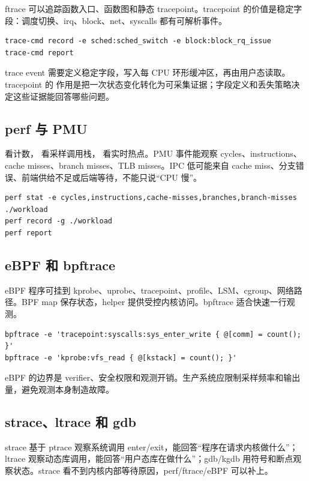 ftrace 可以追踪函数入口、函数图和静态 tracepoint。tracepoint 的价值是稳定字段：调度切换、irq、block、net、syscalls 都有可解析事件。

\begin{lstlisting}
trace-cmd record -e sched:sched_switch -e block:block_rq_issue
trace-cmd report
\end{lstlisting}

trace event 需要定义稳定字段，写入每 CPU 环形缓冲区，再由用户态读取。tracepoint 的
作用是把一次状态变化转化为可采集证据；字段定义和丢失策略决定这些证据能回答哪些问题。

\subsection{perf 与 PMU}

 看计数， 看采样调用栈， 看实时热点。PMU 事件能观察 cycles、instructions、cache misses、branch misses、TLB misses。IPC 低可能来自 cache miss、分支错误、前端供给不足或后端等待，不能只说“CPU 慢”。

\begin{lstlisting}
perf stat -e cycles,instructions,cache-misses,branches,branch-misses ./workload
perf record -g ./workload
perf report
\end{lstlisting}

\subsection{eBPF 和 bpftrace}

eBPF 程序可挂到 kprobe、uprobe、tracepoint、profile、LSM、cgroup、网络路径。BPF map 保存状态，helper 提供受控内核访问。bpftrace 适合快速一行观测。

\begin{lstlisting}
bpftrace -e 'tracepoint:syscalls:sys_enter_write { @[comm] = count(); }'
bpftrace -e 'kprobe:vfs_read { @[kstack] = count(); }'
\end{lstlisting}

eBPF 的边界是 verifier、安全权限和观测开销。生产系统应限制采样频率和输出量，避免观测本身制造故障。

\subsection{strace、ltrace 和 gdb}

strace 基于 ptrace 观察系统调用 enter/exit，能回答“程序在请求内核做什么”；ltrace 观察动态库调用，能回答“用户态库在做什么”；gdb/kgdb 用符号和断点观察状态。strace 看不到内核内部等待原因，perf/ftrace/eBPF 可以补上。

